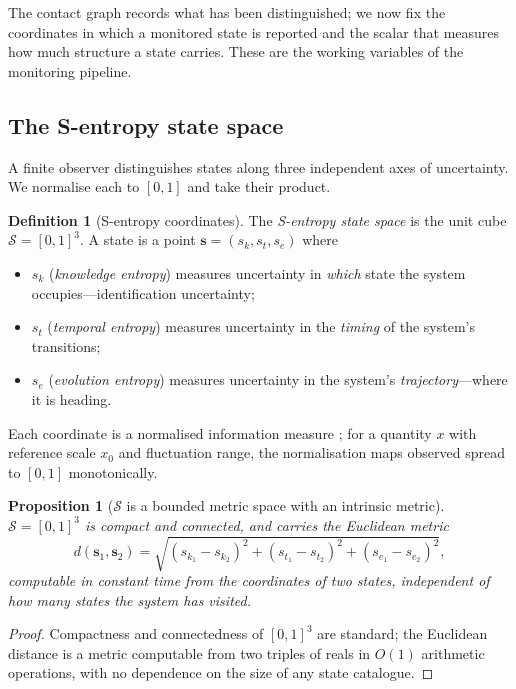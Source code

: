\documentclass[11pt,twocolumn,a4paper]{article}
\theoremstyle{thmstyle}
\newtheorem{proposition}[theorem]{Proposition}
\theoremstyle{definition}
\newtheorem{definition}[theorem]{Definition}
\theoremstyle{remark}
\newcommand{\Sspace}{\mathcal{S}}
\newcommand{\Scoord}{\mathbf{s}}
\newcommand{\Sk}{s_{k}}
\newcommand{\St}{s_{t}}
\newcommand{\Se}{s_{e}}
\begin{document}
The contact graph records what has been distinguished; we now fix the
coordinates in which a monitored state is reported and the scalar that
measures how much structure a state carries. These are the working
variables of the monitoring pipeline.

\subsection{The S-entropy state space}

A finite observer distinguishes states along three independent axes of
uncertainty. We normalise each to $[0,1]$ and take their product.

\begin{definition}[S-entropy coordinates]
\label{def:sspace}
The \emph{S-entropy state space} is the unit cube
$\Sspace=[0,1]^3$. A state is a point $\Scoord=(\Sk,\St,\Se)$ where
\begin{itemize}[leftmargin=1.4em,nosep]
\item $\Sk$ (\emph{knowledge entropy}) measures uncertainty in \emph{which}
state the system occupies---identification uncertainty;
\item $\St$ (\emph{temporal entropy}) measures uncertainty in the
\emph{timing} of the system's transitions;
\item $\Se$ (\emph{evolution entropy}) measures uncertainty in the
system's \emph{trajectory}---where it is heading.
\end{itemize}
Each coordinate is a normalised information measure
\citep{shannon1948mathematical,jaynes1957information}; for a quantity $x$
with reference scale $x_0$ and fluctuation range, the normalisation maps
observed spread to $[0,1]$ monotonically.
\end{definition}

\begin{proposition}[$\Sspace$ is a bounded metric space with an intrinsic
metric]
\label{prop:metric}
$\Sspace=[0,1]^3$ is compact and connected, and carries the Euclidean
metric
\[
d(\Scoord_1,\Scoord_2)=\sqrt{(\Sk_1-\Sk_2)^2+(\St_1-\St_2)^2+(\Se_1-\Se_2)^2},
\]
computable in constant time from the coordinates of two states, independent
of how many states the system has visited.
\end{proposition}

\begin{proof}
Compactness and connectedness of $[0,1]^3$ are standard; the Euclidean
distance is a metric computable from two triples of reals in $O(1)$
arithmetic operations, with no dependence on the size of any state
catalogue.
\end{proof}
\end{document}
